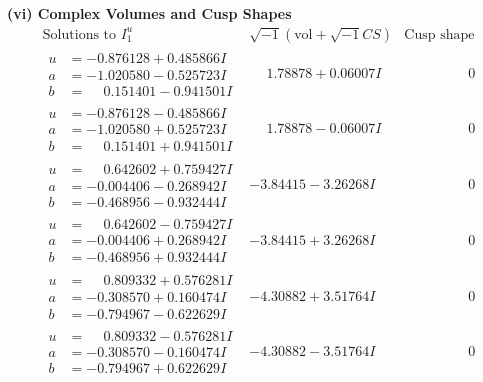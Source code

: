 \documentclass[1p]{elsarticle_modified}
\theoremstyle{definition}
\newcommand{\I}{\sqrt{-1}}
\begin{document}
\newpage\flushleft \textbf{(vi) Complex Volumes and Cusp Shapes}
$$\begin{array}{c|c|c}  
\text{Solutions to }I^u_{1}& \I (\text{vol} + \sqrt{-1}CS) & \text{Cusp shape}\\
 \hline 
\begin{aligned}
u &= -0.876128 + 0.485866 I \\
a &= -1.020580 - 0.525723 I \\
b &= \phantom{-}0.151401 - 0.941501 I\end{aligned}
 & \phantom{-}1.78878 + 0.06007 I & \phantom{-0.000000 } 0 \\ \hline\begin{aligned}
u &= -0.876128 - 0.485866 I \\
a &= -1.020580 + 0.525723 I \\
b &= \phantom{-}0.151401 + 0.941501 I\end{aligned}
 & \phantom{-}1.78878 - 0.06007 I & \phantom{-0.000000 } 0 \\ \hline\begin{aligned}
u &= \phantom{-}0.642602 + 0.759427 I \\
a &= -0.004406 - 0.268942 I \\
b &= -0.468956 - 0.932444 I\end{aligned}
 & -3.84415 - 3.26268 I & \phantom{-0.000000 } 0 \\ \hline\begin{aligned}
u &= \phantom{-}0.642602 - 0.759427 I \\
a &= -0.004406 + 0.268942 I \\
b &= -0.468956 + 0.932444 I\end{aligned}
 & -3.84415 + 3.26268 I & \phantom{-0.000000 } 0 \\ \hline\begin{aligned}
u &= \phantom{-}0.809332 + 0.576281 I \\
a &= -0.308570 + 0.160474 I \\
b &= -0.794967 - 0.622629 I\end{aligned}
 & -4.30882 + 3.51764 I & \phantom{-0.000000 } 0 \\ \hline\begin{aligned}
u &= \phantom{-}0.809332 - 0.576281 I \\
a &= -0.308570 - 0.160474 I \\
b &= -0.794967 + 0.622629 I\end{aligned}
 & -4.30882 - 3.51764 I & \phantom{-0.000000 } 0 \\ \hline\begin{aligned}

\end{aligned}
\end{array}$$
\end{document}
